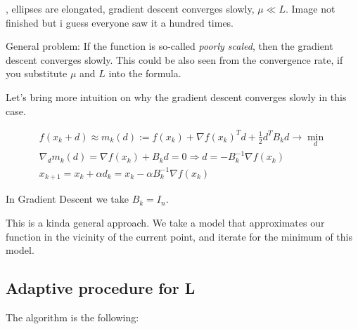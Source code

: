 , ellipses are elongated, gradient descent converges slowly, $\mu \ll L$. Image not finished but i guess everyone saw it a hundred times.

\begin{center}
\end{center}

\notice \; General problem: If the function is so-called \textit{poorly scaled}, then the gradient descent converges slowly. This could be also seen from the convergence rate, if you substitute $\mu$ and $L$ into the formula.

Let's bring more intuition on why the gradient descent converges slowly in this case. 

\begin{gather*}
    f(x_k + d) \approx m_k(d) := f(x_k) + \nabla f(x_k)^T d + \frac{1}{2} d^T B_k d \to \min_{d} \\ 
    \nabla_d m_k(d) = \nabla f(x_k) + B_k d = 0 \Longrightarrow d = -B_k^{-1} \nabla f(x_k) \\ 
    x_{k+1} = x_k + \alpha d_k = x_k - \alpha B_k^{-1} \nabla f(x_k)
\end{gather*}

\notice \; In Gradient Descent we take $B_k = I_n$. 

This is a kinda general approach. We take a model that approximates our function in the vicinity of the current point, and iterate for the minimum of this model.

\subsection{Adaptive procedure for L}

The algorithm is the following:

